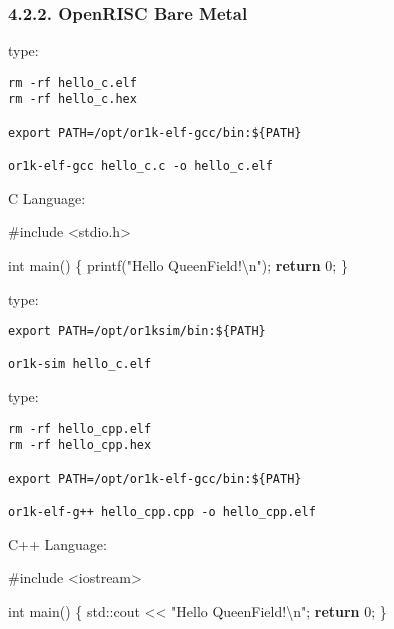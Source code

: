 \documentclass[]{article}
\newenvironment{Shaded}{}{}
\newcommand{\DataTypeTok}[1]{\textcolor[rgb]{0.56,0.13,0.00}{#1}}
\newcommand{\DecValTok}[1]{\textcolor[rgb]{0.25,0.63,0.44}{#1}}
\newcommand{\SpecialCharTok}[1]{\textcolor[rgb]{0.25,0.44,0.63}{#1}}
\newcommand{\StringTok}[1]{\textcolor[rgb]{0.25,0.44,0.63}{#1}}
\newcommand{\ImportTok}[1]{#1}
\newcommand{\ControlFlowTok}[1]{\textcolor[rgb]{0.00,0.44,0.13}{\textbf{#1}}}
\newcommand{\BuiltInTok}[1]{#1}
\newcommand{\PreprocessorTok}[1]{\textcolor[rgb]{0.74,0.48,0.00}{#1}}
\newcommand{\NormalTok}[1]{#1}
\begin{document}
\subsubsection{4.2.2. OpenRISC Bare Metal}\label{openrisc-bare-metal}

type:

\begin{verbatim}
rm -rf hello_c.elf
rm -rf hello_c.hex

export PATH=/opt/or1k-elf-gcc/bin:${PATH}

or1k-elf-gcc hello_c.c -o hello_c.elf
\end{verbatim}

C Language:

\begin{Shaded}
\begin{Highlighting}[]
\PreprocessorTok{#include }\ImportTok{<stdio.h>}

\DataTypeTok{int}\NormalTok{ main() \{}
\NormalTok{  printf(}\StringTok{"Hello QueenField!}\SpecialCharTok{\textbackslash{}n}\StringTok{"}\NormalTok{);}
  \ControlFlowTok{return} \DecValTok{0}\NormalTok{;}
\NormalTok{\}}
\end{Highlighting}
\end{Shaded}

type:

\begin{verbatim}
export PATH=/opt/or1ksim/bin:${PATH}

or1k-sim hello_c.elf
\end{verbatim}

type:

\begin{verbatim}
rm -rf hello_cpp.elf
rm -rf hello_cpp.hex

export PATH=/opt/or1k-elf-gcc/bin:${PATH}

or1k-elf-g++ hello_cpp.cpp -o hello_cpp.elf
\end{verbatim}

C++ Language:

\begin{Shaded}
\begin{Highlighting}[]
\PreprocessorTok{#include }\ImportTok{<iostream>}

\DataTypeTok{int}\NormalTok{ main() \{}
  \BuiltInTok{std::}\NormalTok{cout << }\StringTok{"Hello QueenField!}\SpecialCharTok{\textbackslash{}n}\StringTok{"}\NormalTok{;}
  \ControlFlowTok{return} \DecValTok{0}\NormalTok{;}
\NormalTok{\}}
\end{Highlighting}
\end{Shaded}
\end{document}

